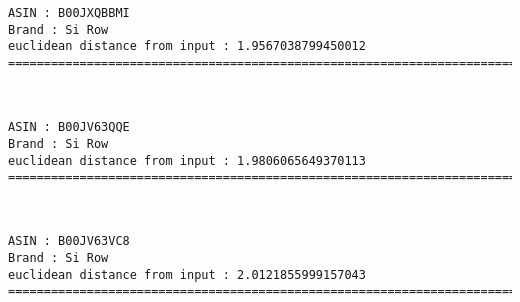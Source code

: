 \documentclass[11pt]{article}
\begin{document}
    \begin{Verbatim}[commandchars=\\\{\}]
ASIN : B00JXQBBMI
Brand : Si Row
euclidean distance from input : 1.9567038799450012
=============================================================================================================================

    \end{Verbatim}

    
    
    \begin{center}
    \end{center}
    { \hspace*{\fill} \\}
    
    \begin{Verbatim}[commandchars=\\\{\}]
ASIN : B00JV63QQE
Brand : Si Row
euclidean distance from input : 1.9806065649370113
=============================================================================================================================

    \end{Verbatim}

    
    
    \begin{center}
    \end{center}
    { \hspace*{\fill} \\}
    
    \begin{Verbatim}[commandchars=\\\{\}]
ASIN : B00JV63VC8
Brand : Si Row
euclidean distance from input : 2.0121855999157043
=============================================================================================================================

    \end{Verbatim}

    
    
    \begin{center}
    \end{center}
    { \hspace*{\fill} \\}
    
\end{document}
